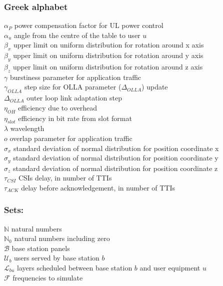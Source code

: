 \subsubsection*{Greek alphabet}

$\alpha_P$ \mytab power compensation factor for UL power control\\
$\alpha_u$ \mytab angle from the centre of the table to user $u$\\
$\beta_x$ \mytab upper limit on uniform distribution for rotation around x axis \\
$\beta_y$ \mytab upper limit on uniform distribution for rotation around y axis \\
$\beta_z$ \mytab upper limit on uniform distribution for rotation around z axis \\
$\gamma$ \mytab burstiness parameter for application traffic\\
$\gamma_{OLLA}$ \mytab step size for OLLA parameter ($\Delta_{OLLA}$) update\\
$\Delta_{OLLA}$ \mytab outer loop link adaptation step\\
$\eta_{OH}$ \mytab efficiency due to overhead\\
$\eta_{slot}$ \mytab efficiency in bit rate from slot format\\
$\lambda$ \mytab wavelength\\
$o$ \mytab overlap parameter for application traffic\\
$\sigma_x$ \mytab standard deviation of normal distribution for position coordinate x \\
$\sigma_y$ \mytab standard deviation of normal distribution for position coordinate y \\
$\sigma_z$ \mytab standard deviation of normal distribution for position coordinate z \\
$\tau_{CSI}$ \mytab \acsp{CSI} delay, in number of \acsp{TTI} \\
$\tau_{ACK}$ \mytab delay before acknowledgement, in number of \acsp{TTI} \\

\subsubsection*{Sets:}

$\mathbb{N}$ \mytab natural numbers \\
$\mathbb{N}_0$ \mytab natural numbers including zero\\
$\mathcal{B}$ \mytab base station panels\\
$\mathcal{U}_b$ \mytab users served by base station $b$\\ 
$\mathcal{L}_{bu}$ \mytab layers scheduled between base station $b$ and user equipment $u$\\
$\mathcal{F}$ \mytab frequencies to simulate\\


